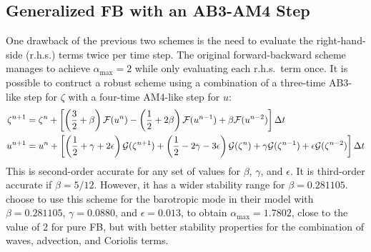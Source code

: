 \subsection{Generalized FB with an AB3-AM4 Step}
One drawback of the previous two schemes is the need to evaluate the
right-hand-side (r.h.s.) terms twice per time step. The original
forward-backward scheme manages to achieve $\alpha_{\max}
= 2$ while only evaluating each r.h.s.\ term once. It is possible to
contruct a robust scheme using a combination of a three-time
AB3-like step for $\zeta$ with a four-time AM4-like step for $u$:
\begin{equation}\begin{split}
   \zeta^{n+1} &= \zeta^n + \left[ \left( \frac{3}{2}+\beta \right)
   {\cal F}(u^n) - \left( \frac{1}{2}+ 2\beta \right) {\cal F}(u^{n-1}) +
   \beta {\cal F}(u^{n-2}) \right] \Delta t \\
   u^{n+1} &= u^n + \left[ \left( \frac{1}{2}+\gamma + 2\epsilon \right)
   {\cal G}(\zeta^{n+1}) +
   \left( \frac{1}{2}-2\gamma-3\epsilon \right){\cal G}(\zeta^n) +
   \gamma {\cal G}(\zeta^{n-1}) + \epsilon  {\cal G}(\zeta^{n-2}) \right]
   \Delta t
\end{split}\end{equation}
This is second-order accurate for any set of values for $\beta$,
$\gamma$, and $\epsilon$. It is third-order accurate if $\beta =
5/12$. However, it has a wider stability range for $\beta =
0.281105$. \citep{SS2008b} choose to use
this scheme for the barotropic mode in their model with $\beta=
0.281105$, $\gamma = 0.0880$, and $\epsilon = 0.013$, to obtain
$\alpha_{\max} = 1.7802$, close to the value of 2 for
pure FB, but with better stability properties for the combination of
waves, advection, and Coriolis terms.
